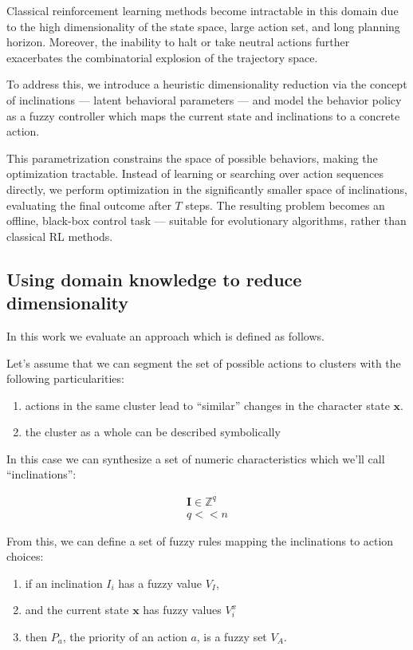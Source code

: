 \documentclass[12pt, a4paper]{article}
\begin{document}
Classical reinforcement learning methods become intractable in this domain due to the high dimensionality of the state space, large action set, and long planning horizon. Moreover, the inability to halt or take neutral actions further exacerbates the combinatorial explosion of the trajectory space.

To address this, we introduce a heuristic dimensionality reduction via the concept of inclinations — latent behavioral parameters — and model the behavior policy as a fuzzy controller which maps the current state and inclinations to a concrete action.

This parametrization constrains the space of possible behaviors, making the optimization tractable. Instead of learning or searching over action sequences directly, we perform optimization in the significantly smaller space of inclinations, evaluating the final outcome after $T$ steps. The resulting problem becomes an offline, black-box control task — suitable for evolutionary algorithms, rather than classical RL methods.

	\subsection{Using domain knowledge to reduce dimensionality}

	In this work we evaluate an approach which is defined as follows.
	
	Let's assume that we can segment the set of possible actions to clusters with the following particularities:
	
	\begin{enumerate}
		\item actions in the same cluster lead to ``similar'' changes in the character state $\mathbf{x}$.
		\item the cluster as a whole can be described symbolically
	\end{enumerate}
	
	In this case we can synthesize a set of numeric characteristics which we'll call ``inclinations'':
	
	\begin{eqnarray}
		\mathbf{I} \in \mathbb{Z}^q\\
		q << n \label{q<<n}
	\end{eqnarray}

	From this, we can define a set of fuzzy rules\cite{ray2014softcomputing} mapping the inclinations to action choices:

	\begin{enumerate}
		\item if an inclination $I_i$ has a fuzzy value $V_I$,
		\item and the current state $\mathbf{x}$ has fuzzy values $V^x_i$
		\item then $P_a$, the priority of an action $a$, is a fuzzy set $V_A$.
	\end{enumerate}
	
\end{document}
